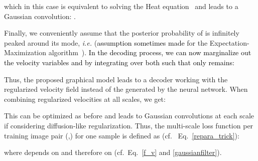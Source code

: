 \documentclass[journal]{IEEEtran}
\newcommand{\update}[1]{\textcolor{black}{#1}}
\begin{document}
which in this case is equivalent to solving the Heat equation~\cite{nielsen1997regularization} and leads to a Gaussian convolution: .

Finally, we conveniently assume that the posterior probability of  is infinitely peaked around its mode, {\em i.e.}  (\update{assumption sometimes made} for the Expectation-Maximization algorithm~\cite{DBLP:journals/neco/KuriharaW09}). \update{In the decoding process, we can now marginalize out the velocity variables  and  by integrating over  both such that only  remains:}

Thus, the proposed graphical model leads to a decoder working with the regularized velocity field  instead of the  generated by the neural network. 
When combining regularized velocities  at all scales, we get: 

This can be optimized as before and leads to Gaussian convolutions at each scale if considering diffusion-like regularization. Thus, the multi-scale loss function per training image pair (,) for one sample  is defined as (cf.~ Eq.~\ref{repara_trick}):

where  depends on  and therefore on  (cf.~Eq.~\ref{f_v} and \ref{gaussianfilter}).
\end{document}
